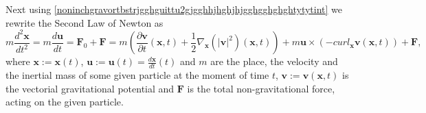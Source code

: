 \documentclass{article}
\theoremstyle{definition}
\theoremstyle{remark}
\renewcommand{\vec}[1]{\mathbf{#1}}
\newcommand{\er}{\eqref}
\newcommand{\er}{\eqref}
\begin{document}
Next using
\er{noninchgravortbstrjgghguittu2gjgghhjhghjhjgghgghghghtytytint} we
rewrite the Second Law of Newton as
\begin{equation}\label{noninchgravortbstrjgghguittu2gjgghhjhghjhjgghgghghghtytythvfghfgghjggint}
m\frac{d^2\vec x}{dt^2}=m\frac{d\vec u}{dt}=\vec F_0+\vec
F=m\left(\frac{\partial\vec v}{\partial t}(\vec
x,t)+\frac{1}{2}\nabla_{\vec x}\left(\left|\vec
v\right|^2\right)(\vec x,t)\right)+m\vec u\times \left(-curl_{\vec
x}\vec v(\vec x,t)\right)+\vec F,
\end{equation}
where $\vec x:=\vec x(t)$, $\vec u:=\vec u(t)=\frac{d\vec x}{dt}(t)$
and $m$ are the place, the velocity and the inertial mass of some
given particle at the moment of time $t$, $\vec v:=\vec v(\vec x,t)$
is the vectorial gravitational potential and $\vec F$ is the total
non-gravitational force, acting on the given particle.
\end{document}
